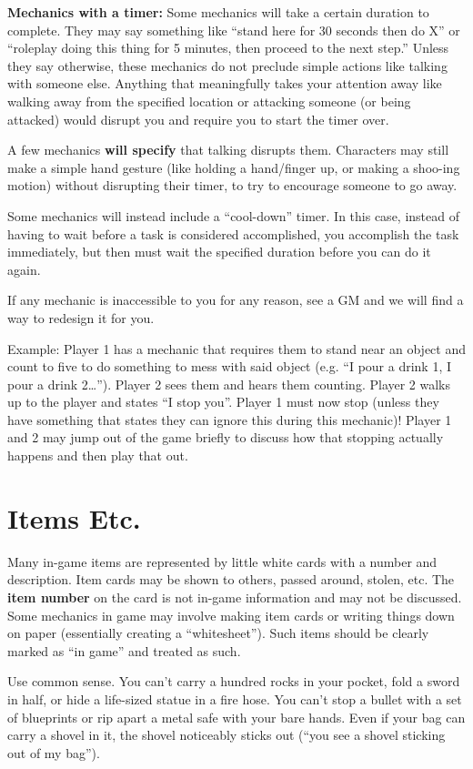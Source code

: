 \documentclass[sheet]{GL2020}
\begin{document}
\textbf{Mechanics with a timer:} Some mechanics will take a certain duration to complete. They may say something like  ``stand here for 30 seconds then do X'' or ``roleplay doing this thing for 5 minutes, then proceed to the next step.'' Unless they say otherwise, these mechanics do not preclude simple actions like talking with someone else. Anything that meaningfully takes your attention away like walking away from the specified location or attacking someone (or being attacked) would disrupt you and require you to start the timer over.

A few mechanics \textbf{will specify} that talking disrupts them. Characters may still make a simple hand gesture (like holding a hand/finger up, or making a shoo-ing motion) without disrupting their timer, to try to encourage someone to go away.

Some mechanics will instead include a ``cool-down'' timer. In this case, instead of having to wait before a task is considered accomplished, you accomplish the task immediately, but then must wait the specified duration before you can do it again. 

If any mechanic is inaccessible to you for any reason, see a GM and we will find a way to redesign it for you.

Example:
Player 1 has a mechanic that requires them to stand near an object and count to five to do something to mess with said object (e.g. “I pour a drink 1, I pour a drink 2…”).  Player 2 sees them and hears them counting.  Player 2 walks up to the player and states “I stop you”.  Player 1 must now stop (unless they have something that states they can ignore this during this mechanic)!  Player 1 and 2 may jump out of the game briefly to discuss how that stopping actually happens and then play that out.    

\section{Items Etc.}

Many in-game items are represented by little white cards with a number and description.  Item cards may be shown to others, passed around, stolen, etc.  The {\bf item number} on the card is not in-game information and may not be discussed. Some mechanics in game may involve making item cards or writing things down on paper (essentially creating a ``whitesheet''). Such items should be clearly marked as ``in game'' and treated as such.

Use common sense. You can't carry a hundred rocks in your pocket, fold a sword in half, or hide a life-sized statue in a fire hose. You can't stop a bullet with a set of blueprints or rip apart a metal safe with your bare hands.  Even if your bag can carry a shovel in it, the shovel noticeably sticks out (``you see a shovel sticking out of my bag'').
\end{document}
